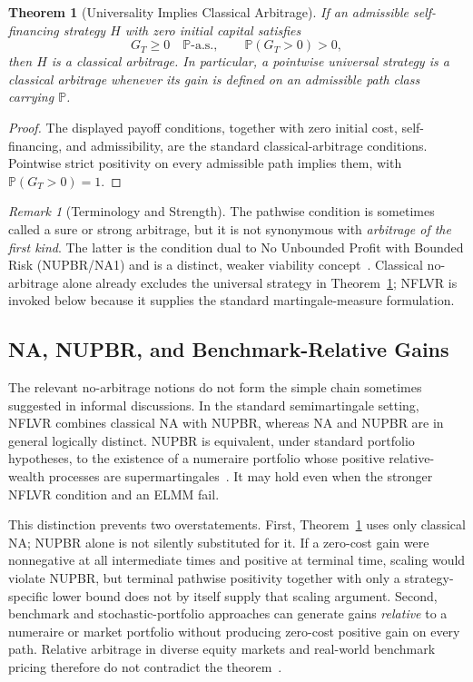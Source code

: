 \documentclass[aps,pra,reprint,superscriptaddress,amsmath,amssymb,floatfix]{revtex4-2}
\theoremstyle{plain}
\newtheorem{theorem}{Theorem}
\theoremstyle{definition}
\theoremstyle{remark}
\newtheorem{remark}{Remark}
\begin{document}
\begin{theorem}[Universality Implies Classical Arbitrage]
  \label{thm:arbitrage}
  If an admissible self-financing strategy \(H\) with zero initial capital
  satisfies
  \[
    G_T\geq0\quad\mathbb{P}\text{-a.s.},
    \qquad
    \mathbb{P}(G_T>0)>0,
  \]
  then \(H\) is a classical arbitrage. In particular, a pointwise universal
  strategy is a classical arbitrage whenever its gain is defined on an
  admissible path class carrying \(\mathbb{P}\).
\end{theorem}

\begin{proof}
The displayed payoff conditions, together with zero initial cost,
self-financing, and admissibility, are the standard classical-arbitrage
conditions. Pointwise strict positivity on every admissible path implies them,
with \(\mathbb{P}(G_T>0)=1\).
\end{proof}

\begin{remark}[Terminology and Strength]
The pathwise condition is sometimes called a sure or strong arbitrage, but it
is not synonymous with \emph{arbitrage of the first kind}. The latter is the
condition dual to No Unbounded Profit with Bounded Risk (NUPBR/NA1) and is a
distinct, weaker viability concept~\cite{Kardaras2012}. Classical
no-arbitrage alone already excludes the universal strategy in
Theorem~\ref{thm:arbitrage}; NFLVR is invoked below because it supplies the
standard martingale-measure formulation.
\end{remark}

\subsection{NA, NUPBR, and Benchmark-Relative Gains}

The relevant no-arbitrage notions do not form the simple chain sometimes
suggested in informal discussions. In the standard semimartingale setting,
NFLVR combines classical NA with NUPBR, whereas NA and NUPBR are in general
logically distinct. NUPBR is equivalent, under standard portfolio hypotheses,
to the existence of a numeraire portfolio whose positive relative-wealth
processes are supermartingales~\cite{KaratzasKardaras2007,Kardaras2012}.
It may hold even when the stronger NFLVR condition and an ELMM fail.

This distinction prevents two overstatements. First, Theorem~\ref{thm:arbitrage}
uses only classical NA; NUPBR alone is not silently substituted for it. If a
zero-cost gain were nonnegative at all intermediate times and positive at
terminal time, scaling would violate NUPBR, but terminal pathwise positivity
together with only a strategy-specific lower bound does not by itself supply
that scaling argument. Second, benchmark and stochastic-portfolio approaches
can generate gains \emph{relative} to a numeraire or market portfolio without
producing zero-cost positive gain on every path. Relative arbitrage in diverse
equity markets and real-world benchmark pricing therefore do not contradict
the theorem~\cite{FernholzKaratzasKardaras2005,PlatenHeath2010}.
\end{document}
